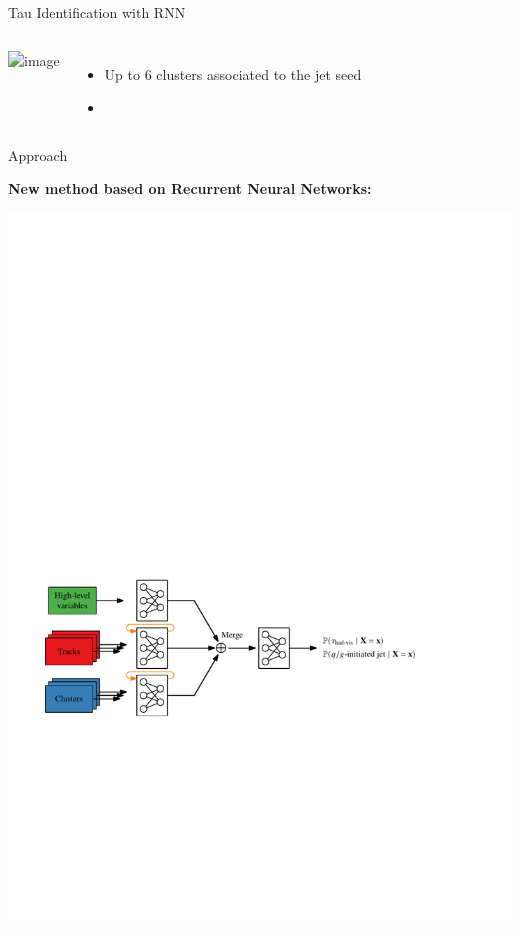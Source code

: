 \documentclass[11pt, xcolor={dvipsnames}, aspectratio=169]{beamer}
\begin{document}
\begin{frame}{Tau Identification with RNN}
\begin{columns}[onlytextwidth]
\begin{columns}[onlytextwidth]
      \centering

      \includegraphics<1>[width=0.9\textwidth]{tauid/invars/invars_cls1relet_3P}
    \end{columns}

    \vspace*{0.5em}

    \begin{itemize}
    \item Up to 6 clusters associated to the jet seed
    \item
    \end{itemize}
  \end{columns}
\end{frame}


\begin{frame}{Approach}

  \textbf{New method based on Recurrent Neural Networks:}\\[0.5em]
  \begin{center}
    \includegraphics[scale=0.75]{tauid/rnn_approach}
  \end{center}
\end{frame}
\end{document}
